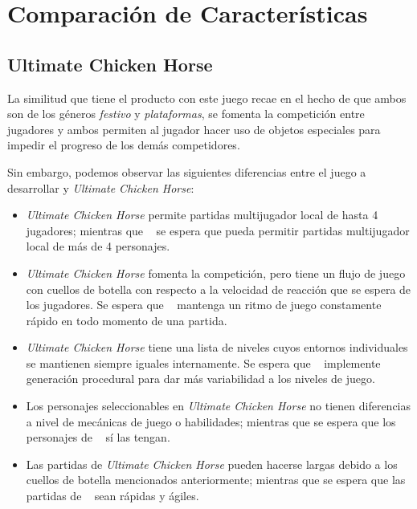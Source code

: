 \section{Comparación de Características} %

\subsection{Ultimate Chicken Horse}

La similitud que tiene el producto con este juego recae en el hecho de que ambos
son de los géneros \emph{festivo} y \emph{plataformas}, se fomenta la
competición entre jugadores y ambos permiten al jugador hacer uso de objetos
especiales para impedir el progreso de los demás competidores.

Sin embargo, podemos observar las siguientes diferencias entre el juego a
desarrollar y \emph{Ultimate Chicken Horse}:
\begin{itemize}
    \item \emph{Ultimate Chicken Horse} permite partidas multijugador local de
    hasta 4 jugadores; mientras que \emph{\izenburua\ } se espera que pueda
    permitir partidas multijugador local de más de 4 personajes.
    \item \emph{Ultimate Chicken Horse} fomenta la competición, pero tiene un
    flujo de juego con cuellos de botella con respecto a la velocidad de
    reacción que se espera de los jugadores. Se espera que \emph{\izenburua\ }
    mantenga un ritmo de juego constamente rápido en todo momento de una
    partida.
    \item \emph{Ultimate Chicken Horse} tiene una lista de niveles cuyos
    entornos individuales se mantienen siempre iguales internamente. Se espera
    que \emph{\izenburua\ } implemente generación procedural para dar más
    variabilidad a los niveles de juego.
    \item Los personajes seleccionables en \emph{Ultimate Chicken Horse} no
    tienen diferencias a nivel de mecánicas de juego o habilidades; mientras que
    se espera que los personajes de \emph{\izenburua\ } sí las tengan.
    \item Las partidas de \emph{Ultimate Chicken Horse} pueden hacerse largas
    debido a los cuellos de botella mencionados anteriormente; mientras que se
    espera que las partidas de \emph{\izenburua\ } sean rápidas y ágiles.
\end{itemize}


